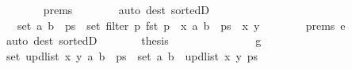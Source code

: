\begin{isabellebody}
\ \ \ \ \ \ \isamarkupfalse%
\ {\isachardoublequoteopen}{}{\isachardot}{\kern0pt}prems{\isachardoublequoteclose}\isanewline
\ \ \ \ \ \ \isamarkupfalse%
\ {\isacharparenleft}{\kern0pt}auto\ dest{\isacharcolon}{\kern0pt}\ sorted{}D{\isacharparenright}{\kern0pt}\isanewline
\ \ \ \ \isamarkupfalse%
\ \isamarkupfalse%
\ {\isachardoublequoteopen}{\isachardot}{\kern0pt}{\isachardot}{\kern0pt}{\isachardot}{\kern0pt}\ {\isacharequal}{\kern0pt}\ set\ {\isacharparenleft}{\kern0pt}{\isacharparenleft}{\kern0pt}a{\isacharcomma}{\kern0pt}\ b{\isacharparenright}{\kern0pt}\ {\isacharhash}{\kern0pt}\ ps{\isacharparenright}{\kern0pt}\ {\isacharminus}{\kern0pt}\ set\ {\isacharparenleft}{\kern0pt}filter\ {\isacharparenleft}{\kern0pt}{\isasymlambda}p{\isachardot}{\kern0pt}\ fst\ p\ {\isacharequal}{\kern0pt}\ x{\isacharparenright}{\kern0pt}\ {\isacharparenleft}{\kern0pt}{\isacharparenleft}{\kern0pt}a{\isacharcomma}{\kern0pt}\ b{\isacharparenright}{\kern0pt}\ {\isacharhash}{\kern0pt}\ ps{\isacharparenright}{\kern0pt}{\isacharparenright}{\kern0pt}\ {\isasymunion}\ {\isacharbraceleft}{\kern0pt}{\isacharparenleft}{\kern0pt}x{\isacharcomma}{\kern0pt}\ y{\isacharparenright}{\kern0pt}{\isacharbraceright}{\kern0pt}{\isachardoublequoteclose}\isanewline
\ \ \ \ \ \ \isamarkupfalse%
\ {\isachardoublequoteopen}{}{\isachardot}{\kern0pt}prems{\isachardoublequoteclose}\ e\isanewline
\ \ \ \ \ \ \isamarkupfalse%
\ {\isacharparenleft}{\kern0pt}auto\ dest{\isacharcolon}{\kern0pt}\ sorted{}D{\isacharparenright}{\kern0pt}\isanewline
\ \ \ \ \isamarkupfalse%
\ \isamarkupfalse%
\ {\isacharquery}{\kern0pt}thesis\isanewline
\ \ \ \ \ \ \isacommand{{\isachardot}{\kern0pt}}\isamarkupfalse%
\isanewline
\ \ \isamarkupfalse%
\isanewline
\ \ \ \ \isamarkupfalse%
\ g\isanewline
\ \ \ \ \isamarkupfalse%
\ {\isachardoublequoteopen}set\ {\isacharparenleft}{\kern0pt}upd{\isacharunderscore}{\kern0pt}list\ x\ y\ {\isacharparenleft}{\kern0pt}{\isacharparenleft}{\kern0pt}a{\isacharcomma}{\kern0pt}\ b{\isacharparenright}{\kern0pt}\ {\isacharhash}{\kern0pt}\ ps{\isacharparenright}{\kern0pt}{\isacharparenright}{\kern0pt}\ {\isacharequal}{\kern0pt}\ set\ {\isacharparenleft}{\kern0pt}{\isacharparenleft}{\kern0pt}a{\isacharcomma}{\kern0pt}\ b{\isacharparenright}{\kern0pt}\ {\isacharhash}{\kern0pt}\ upd{\isacharunderscore}{\kern0pt}list\ x\ y\ ps{\isacharparenright}{\kern0pt}{\isachardoublequoteclose}\isanewline

\end{isabellebody}
